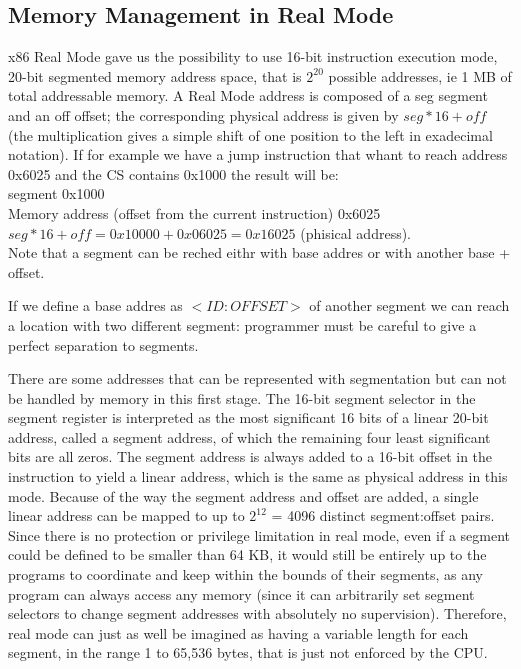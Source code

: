 \documentclass[a4paper,12pt]{article}
\begin{document}
\subsection{Memory Management in Real Mode}
x86 Real Mode gave us the possibility to use 16-bit instruction execution mode, 20-bit segmented memory address space, that is $2^20$ possible addresses, ie 1 MB of total addressable memory.
A Real Mode address is composed of a seg segment and an off offset; the corresponding physical address is given by $seg*16+off$ (the multiplication gives a simple shift of one position to the left in exadecimal notation). If for example we have a jump instruction that whant to reach address 0x6025 and the CS contains 0x1000 the result will be:\\
segment 0x1000 \\
Memory address (offset from the current instruction) 0x6025 \\
$seg*16+off=0x10000+0x06025=0x16025$ (phisical address). \\
Note that a segment can be reched eithr with base addres or with another base + offset.

If we define a base addres as $<ID:OFFSET>$ of another segment we can reach a location with two different segment: programmer must be careful to give a perfect separation to segments.

There are some addresses that can be represented with segmentation but can not be handled by memory in this first stage. The 16-bit segment selector in the segment register is interpreted as the most significant 16 bits of a linear 20-bit address, called a segment address, of which the remaining four least significant bits are all zeros. The segment address is always added to a 16-bit offset in the instruction to yield a linear address, which is the same as physical address in this mode. Because of the way the segment address and offset are added, a single linear address can be mapped to up to $2^12$ = 4096 distinct segment:offset pairs.
Since there is no protection or privilege limitation in real mode, even if a segment could be defined to be smaller than 64 KB, it would still be entirely up to the programs to coordinate and keep within the bounds of their segments, as any program can always access any memory (since it can arbitrarily set segment selectors to change segment addresses with absolutely no supervision). Therefore, real mode can just as well be imagined as having a variable length for each segment, in the range 1 to 65,536 bytes, that is just not enforced by the CPU. 
\end{document}
